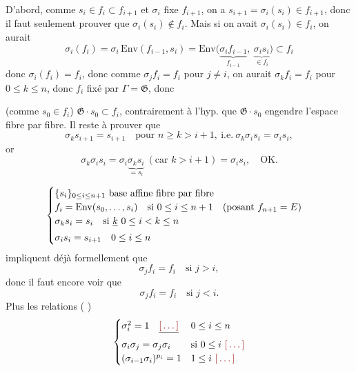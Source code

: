 \documentclass[11pt,a4paper]{article}
\begin{document}
D'abord, comme $s_i\in f_i\subset f_{i+1}$ et $\sigma_i$ fixe $f_{i+1}$, on a $s_{i+1}=\sigma_i(s_i)\in f_{i+1}$, donc il faut seulement prouver  que $\sigma_i(s_i)\notin f_i$.  Mais si on avait $\sigma_i(s_i)\in f_i$,   on aurait
\[
\sigma_i(f_i) = \sigma_i\,\mathrm{Env}(f_{i-1},s_i) = \mathrm{Env}\bigl(\underbrace{\sigma_i f_{i-1}}_{f_{i-1}},\ \underbrace{\sigma_i s_i}_{\in f_i}\bigr)\subset f_i
\]
donc $\sigma_i(f_i)=f_i$, donc comme $\sigma_j f_i=f_i$ pour $j\neq i$, on aurait $\sigma_k f_i=f_i$ pour $0\leq k\leq n$, donc $f_i$ fixé par $\Gamma=\mathfrak{G}$, donc

(comme $s_0\in f_i$) $\mathfrak{G}\cdot s_0\subset f_i$, contrairement à l'hyp. que $\mathfrak{G}\cdot s_0$ engendre l'espace fibre par fibre. Il reste à prouver que
\[
\sigma_k s_{i+1}=s_{i+1}\quad\text{pour } n\geq k>i+1,\ \text{i.e.}\ \sigma_k\sigma_i s_i=\sigma_i s_i ,
\]
or
\[
\sigma_k\sigma_i s_i = \sigma_i\underbrace{\sigma_k s_i}_{=s_i}\ (\text{car } k>i+1) = \sigma_i s_i ,\quad \text{OK.}
\]

\[
\begin{cases}
\{s_i\}_{0\leq i\leq n+1}\ \text{base affine fibre par fibre} \\
f_i=\mathrm{Env}(s_0,\dots,s_i) \quad \text{si } 0\leq i\leq n+1 \quad (\text{posant } f_{n+1}=E) \\
\sigma_k s_i = s_i \quad \text{si } \struck{k}\ 0\leq i<k\leq n \\
\sigma_i s_i = s_{i+1} \quad 0\leq i\leq n
\end{cases}
\]
impliquent déjà  formellement que
\[
\sigma_j f_i = f_i \quad\text{si } j>i ,
\]
donc il faut encore voir  \ill{} que 
\[
\sigma_j f_i = f_i \quad\text{si } j<i .
\]
 Plus les relations (\ill{} \ill{})
\[
\begin{cases}
\sigma_i^2=1 \quad \struck{\ill{}} & 0\leq i\leq n \\
\sigma_i\sigma_j=\sigma_j\sigma_i & \text{si } 0\leq i\ \ill{} \\
(\sigma_{i-1}\sigma_i)^{p_i}=1 & 1\leq i\ \ill{}
\end{cases}
\]
\end{document}
